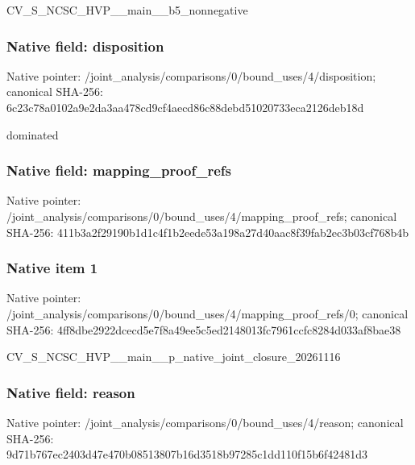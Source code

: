 \documentclass[10pt,a4paper]{article}
\begin{document}
\begingroup\raggedright\sloppy CV\_\allowbreak{}S\_\allowbreak{}NCSC\_\allowbreak{}HVP\_\allowbreak{}\_\allowbreak{}main\_\allowbreak{}\_\allowbreak{}b5\_\allowbreak{}nonnegative\par\endgroup

\subsubsection{Native field: disposition}
Native pointer: /joint\_\allowbreak{}analysis/comparisons/0/bound\_\allowbreak{}uses/4/disposition; canonical SHA-256: 6c23c78a0102a9e2da3aa478cd9cf4aecd86c88debd51020733eca2126deb18d

\begingroup\raggedright\sloppy dominated\par\endgroup

\subsubsection{Native field: mapping\_\allowbreak{}proof\_\allowbreak{}refs}
Native pointer: /joint\_\allowbreak{}analysis/comparisons/0/bound\_\allowbreak{}uses/4/mapping\_\allowbreak{}proof\_\allowbreak{}refs; canonical SHA-256: 411b3a2f29190b1d1c4f1b2eede53a198a27d40aac8f39fab2ec3b03cf768b4b

\subsubsection{Native item 1}
Native pointer: /joint\_\allowbreak{}analysis/comparisons/0/bound\_\allowbreak{}uses/4/mapping\_\allowbreak{}proof\_\allowbreak{}refs/0; canonical SHA-256: 4ff8dbe2922dcecd5e7f8a49ee5c5ed2148013fc7961ccfc8284d033af8bae38

\begingroup\raggedright\sloppy CV\_\allowbreak{}S\_\allowbreak{}NCSC\_\allowbreak{}HVP\_\allowbreak{}\_\allowbreak{}main\_\allowbreak{}\_\allowbreak{}p\_\allowbreak{}native\_\allowbreak{}joint\_\allowbreak{}closure\_\allowbreak{}20261116\par\endgroup

\subsubsection{Native field: reason}
Native pointer: /joint\_\allowbreak{}analysis/comparisons/0/bound\_\allowbreak{}uses/4/reason; canonical SHA-256: 9d71b767ec2403d47e470b08513807b16d3518b97285c1dd110f15b6f42481d3
\end{document}
